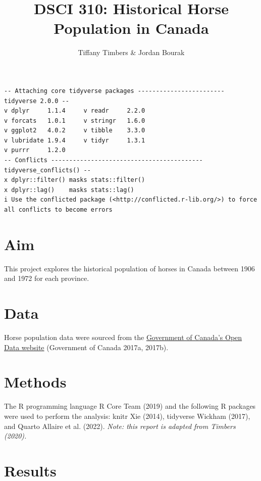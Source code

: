 \documentclass[
  letterpaper,
  DIV=11,
  numbers=noendperiod]{scrartcl}
\title{DSCI 310: Historical Horse Population in Canada}
\author{Tiffany Timbers \& Jordan Bourak}
\date{}
\renewcommand*\contentsname{Table of contents}
\newcommand\contentsname{Table of contents}
\begin{document}
\maketitle

\renewcommand*\contentsname{Table of contents}
{
\hypersetup{linkcolor=}
\setcounter{tocdepth}{1}
\tableofcontents
}

\begin{verbatim}
-- Attaching core tidyverse packages ------------------------ tidyverse 2.0.0 --
v dplyr     1.1.4     v readr     2.2.0
v forcats   1.0.1     v stringr   1.6.0
v ggplot2   4.0.2     v tibble    3.3.0
v lubridate 1.9.4     v tidyr     1.3.1
v purrr     1.2.0     
-- Conflicts ------------------------------------------ tidyverse_conflicts() --
x dplyr::filter() masks stats::filter()
x dplyr::lag()    masks stats::lag()
i Use the conflicted package (<http://conflicted.r-lib.org/>) to force all conflicts to become errors
\end{verbatim}

\section{Aim}\label{aim}

This project explores the historical population of horses in Canada
between 1906 and 1972 for each province.

\section{Data}\label{data}

Horse population data were sourced from the
\href{http://open.canada.ca/en/open-data}{Government of Canada's Open
Data website} (Government of Canada 2017a, 2017b).

\section{Methods}\label{methods}

The R programming language R Core Team (2019) and the following R
packages were used to perform the analysis: knitr Xie (2014), tidyverse
Wickham (2017), and Quarto Allaire et al. (2022). \emph{Note: this
report is adapted from Timbers (2020).}

\section{Results}\label{results}
\end{document}
